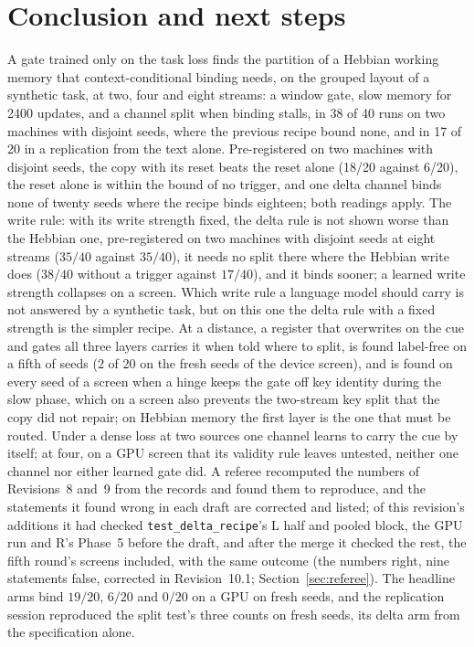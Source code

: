 \documentclass[11pt]{article}
\begin{document}
\section{Conclusion and next steps}

A gate trained only on the task loss finds the partition of a Hebbian working memory that context-conditional binding needs, on the grouped layout of a synthetic task, at two, four and eight streams: a window gate, slow memory for 2400 updates, and a channel split when binding stalls, in 38 of 40 runs on two machines with disjoint seeds, where the previous recipe bound none, and in 17 of 20 in a replication from the text alone. Pre-registered on two machines with disjoint seeds, the copy with its reset beats the reset alone (18/20 against 6/20), the reset alone is within the bound of no trigger, and one delta channel binds none of twenty seeds where the recipe binds eighteen; both readings apply. The write rule: with its write strength fixed, the delta rule is not shown worse than the Hebbian one, pre-registered on two machines with disjoint seeds at eight streams ($35/40$ against $35/40$), it needs no split there where the Hebbian write does ($38/40$ without a trigger against $17/40$), and it binds sooner; a learned write strength collapses on a screen. Which write rule a language model should carry is not answered by a synthetic task, but on this one the delta rule with a fixed strength is the simpler recipe. At a distance, a register that overwrites on the cue and gates all three layers carries it when told where to split, is found label-free on a fifth of seeds (2 of 20 on the fresh seeds of the device screen), and is found on every seed of a screen when a hinge keeps the gate off key identity during the slow phase, which on a screen also prevents the two-stream key split that the copy did not repair; on Hebbian memory the first layer is the one that must be routed. Under a dense loss at two sources one channel learns to carry the cue by itself; at four, on a GPU screen that its validity rule leaves untested, neither one channel nor either learned gate did. A referee recomputed the numbers of Revisions~8 and~9 from the records and found them to reproduce, and the statements it found wrong in each draft are corrected and listed; of this revision's additions it had checked \texttt{test\_delta\_recipe}'s L half and pooled block, the GPU run and R's Phase~5 before the draft, and after the merge it checked the rest, the fifth round's screens included, with the same outcome (the numbers right, nine statements false, corrected in Revision~10.1; Section~\ref{sec:referee}). The headline arms bind $19/20$, $6/20$ and $0/20$ on a GPU on fresh seeds, and the replication session reproduced the split test's three counts on fresh seeds, its delta arm from the specification alone.
\end{document}

